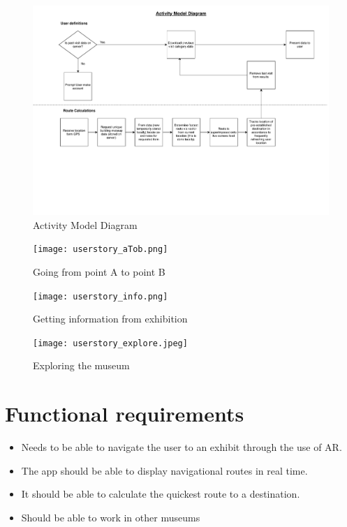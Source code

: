 \begin{figure}[H]
    \centering
    \includegraphics[angle=90, width=\textwidth]
    {assets/Activity_Diagram.pdf}
    \caption{Activity Model Diagram}
    \label{fig:Activity Model Diagram}
\end{figure}

\begin{figure}[H]
    \centering
    \texttt{[image: userstory\_aTob.png]}
    \caption{Going from point A to point B}
    \label{fig:AtoB}
\end{figure}

\begin{figure}[H]
    \texttt{[image: userstory\_info.png]}
    \caption{Getting information from exhibition}
    \label{fig:infofromexhibit}
\end{figure}

\begin{figure}[H]
    \texttt{[image: userstory\_explore.jpeg]}
    \caption{Exploring the museum}
    \label{fig:exploring}
\end{figure}

\section{Functional requirements}
\begin{itemize}
        \item Needs to be able to navigate the user to an exhibit through the use of AR.
        \item The app should be able to display navigational routes in real time.
        \item It should be able to calculate the quickest route to a destination.
        \item Should be able to work in other museums
\end{itemize}

